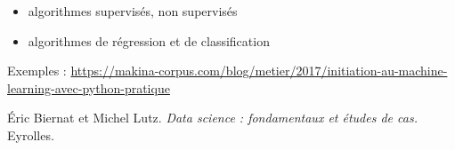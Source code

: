 \begin{itemize}
\item algorithmes supervisés, non supervisés
\item algorithmes de régression et de classification
\end{itemize}


Exemples : 
\url{https://makina-corpus.com/blog/metier/2017/initiation-au-machine-learning-avec-python-pratique}

\begin{thebibliography}{2}
    Éric Biernat et Michel Lutz. {\it Data science : fondamentaux et études de cas.} Eyrolles.
\end{thebibliography}

